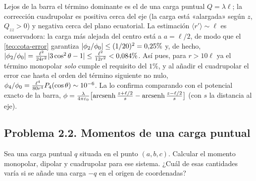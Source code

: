\begin{observacion}\label{obs:sem-barra}
Lejos de la barra el término dominante es el de una carga puntual $Q=\lambda\ell$; la corrección cuadrupolar es positiva cerca del eje (la carga está «alargada» según $z$,
$Q_{zz}>0$) y negativa cerca del plano ecuatorial. La estimación $\langle r'\rangle\sim\ell$ es conservadora: la carga más alejada del centro está a $a=\ell/2$, de modo que
el \cref{teo:cota-error} garantiza $\lvert \phi_{2}/\phi_{0}\rvert\le(1/20)^{2}=0{,}25\%$ y, de hecho, $\lvert \phi_{2}/\phi_{0}\rvert=\frac{\ell^{2}}{24r^{2}}\lvert 3\cos^{2}\theta-1\rvert\le\frac{\ell^{2}}{12r^{2}}<0{,}084\%$.
Así pues, para $r>10\ell$ ya el término monopolar \emph{solo} cumple el requisito del $1\%$, y al añadir el cuadrupolar el error cae hasta el orden del término
siguiente no nulo, $\phi_{4}/\phi_{0}=\frac{\ell^{4}}{80r^{4}}P_{4}(\cos\theta)\sim10^{-6}$. La  lo confirma comparando con el potencial exacto de la
barra, $\phi=\frac{\lambda}{4\pi\varepsilon_{0}}\bigl[\operatorname{arcsenh}\frac{z+\ell/2}{s}-\operatorname{arcsenh}\frac{z-\ell/2}{s}\bigr]$ (con $s$ la distancia al eje).
\end{observacion}

\subsection{Problema 2.2. Momentos de una carga puntual}\label{sem:carga}
\begin{ejercicio}\label{ejer:carga}
Sea una carga puntual $q$ situada en el punto $(a,b,c)$. Calcular el momento monopolar, dipolar y cuadrupolar para ese sistema. ¿Cuál de esas cantidades varía si se añade una
carga $-q$ en el origen de coordenadas?
\end{ejercicio}

